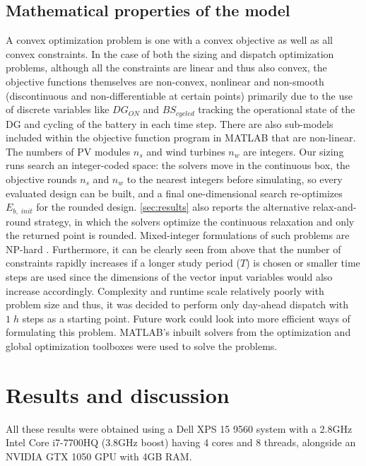 \documentclass[final,3p,times]{elsarticle}
\begin{document}
\subsection{Mathematical properties of the model}

A convex optimization problem is one with a convex objective as well as all convex constraints. In the case of both the sizing and dispatch optimization problems, although all the constraints are linear and thus also convex, the objective functions themselves are non-convex, nonlinear and non-smooth (discontinuous and non-differentiable at certain points) primarily due to the use of discrete variables like $DG_{ON}$ and $BS_{cycled}$ tracking the operational state of the DG and cycling of the battery in each time step. There are also sub-models included within the objective function program in MATLAB that are non-linear. The numbers of PV modules $n_s$ and wind turbines $n_w$ are integers. Our sizing runs search an integer-coded space: the solvers move in the continuous box, the objective rounds $n_s$ and $n_w$ to the nearest integers before simulating, so every evaluated design can be built, and a final one-dimensional search re-optimizes $E_{b,\;init}$ for the rounded design. \cref{sec:results} also reports the alternative relax-and-round strategy, in which the solvers optimize the continuous relaxation and only the returned point is rounded. Mixed-integer formulations of such problems are NP-hard \cite{parisio2013}. Furthermore, it can be clearly seen from above that the number of constraints rapidly increases if a longer study period ($T$) is chosen or smaller time steps are used since the dimensions of the vector input variables would also increase accordingly. Complexity and runtime scale relatively poorly with problem size and thus, it was decided to perform only day-ahead dispatch with $1 \; h$ steps as a starting point. Future work could look into more efficient ways of formulating this problem. MATLAB's inbuilt solvers from the optimization and global optimization toolboxes were used to solve the problems.

\section{Results and discussion \label{sec:results}}

All these results were obtained using a Dell XPS 15 9560 system with a 2.8GHz Intel Core i7-7700HQ (3.8GHz boost) having 4 cores and 8 threads, alongside an NVIDIA GTX 1050 GPU with 4GB RAM. 
\end{document}
